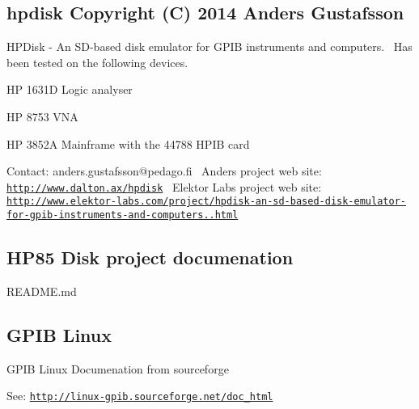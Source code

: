 \subsection*{hpdisk Copyright (C) 2014 Anders Gustafsson}

H\+P\+Disk -\/ An S\+D-\/based disk emulator for G\+P\+IB instruments and computers.~\newline
 Has been tested on the following devices.
\begin{DoxyItemize}
\item HP 1631D Logic analyser
\item HP 8753 V\+NA
\item HP 3852A Mainframe with the 44788 H\+P\+IB card
\end{DoxyItemize}

Contact\+: anders.\+gustafsson@pedago.\+fi~\newline
 Anders project web site\+: \href{http://www.dalton.ax/hpdisk}{\tt http\+://www.\+dalton.\+ax/hpdisk}~\newline
 Elektor Labs project web site\+: \href{http://www.elektor-labs.com/project/hpdisk-an-sd-based-disk-emulator-for-gpib-instruments-and-computers.13693.html}{\tt http\+://www.\+elektor-\/labs.\+com/project/hpdisk-\/an-\/sd-\/based-\/disk-\/emulator-\/for-\/gpib-\/instruments-\/and-\/computers..\+html} 



\subsection*{H\+P85 Disk project documenation}


\begin{DoxyItemize}
\item R\+E\+A\+D\+ME.md 


\end{DoxyItemize}

\subsection*{G\+P\+IB Linux}


\begin{DoxyItemize}
\item G\+P\+IB Linux Documenation from sourceforge
\begin{DoxyItemize}
\item See\+: \href{http://linux-gpib.sourceforge.net/doc_html}{\tt http\+://linux-\/gpib.\+sourceforge.\+net/doc\+\_\+html} 


\end{DoxyItemize}
\end{DoxyItemize}


